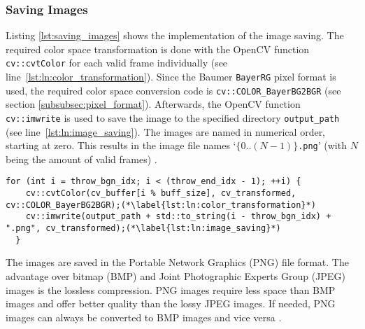 \subsubsection{Saving Images}
\label{subsubsec:saving_images}

Listing \ref{lst:saving_images} shows the implementation of the image saving.
The required color space transformation is done with the OpenCV function \texttt{cv::cvtColor} for each valid frame individually (see line~\ref{lst:ln:color_transformation}).
Since the Baumer \texttt{BayerRG} pixel format is used, the required color space conversion code is \texttt{cv::COLOR\_BayerBG2BGR} (see section \ref{subsubsec:pixel_format}).
Afterwards, the OpenCV function \texttt{cv::imwrite} is used to save the image to the specified directory \texttt{output\_path} (see line~\ref{lst:ln:image_saving}).
The images are named in numerical order, starting at zero.
This results in the image file names `\texttt{$\{0..(N-1)\}$.png}' (with $N$ being the amount of valid frames) \cite{baumer_opencv}.

\vspace{5pt}
\begin{lstlisting}[style=C++, caption={Saving the images}, label=lst:saving_images]
  for (int i = throw_bgn_idx; i < (throw_end_idx - 1); ++i) {
    cv::cvtColor(cv_buffer[i % buff_size], cv_transformed, cv::COLOR_BayerBG2BGR);(*\label{lst:ln:color_transformation}*)
    cv::imwrite(output_path + std::to_string(i - throw_bgn_idx) + ".png", cv_transformed);(*\label{lst:ln:image_saving}*)
  }
\end{lstlisting}

The images are saved in the Portable Network Graphics (PNG) file format.
The advantage over bitmap (BMP) and Joint Photographic Experts Group (JPEG) images is the lossless compression.
PNG images require less space than BMP images and offer better quality than the lossy JPEG images.
If needed, PNG images can always be converted to BMP images and vice versa \cite{image_formats}.
